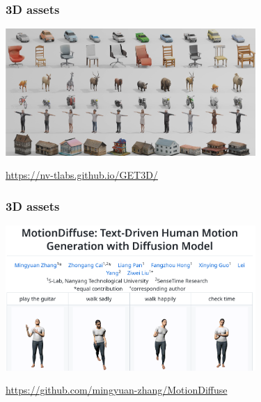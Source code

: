 \documentclass[17pt,aspectratio=169,hyperref={pdfusetitle,colorlinks,allcolors=olive}]{beamer}
\begin{document}
\begin{frame}[fragile]
  \frametitle{3D assets}

  \begin{center}
    \includegraphics[width=9.5cm]{figs/get3d}
  \end{center}

  \begin{flushright}
    {\scriptsize
    \url{https://nv-tlabs.github.io/GET3D/} \\
    }
  \end{flushright}
  
\end{frame}

\begin{frame}[fragile]
  \frametitle{3D assets}

  \begin{center}
    \includegraphics[width=9.5cm]{figs/human-motion}
  \end{center}

  \begin{flushright}
    {\scriptsize
    \url{https://github.com/mingyuan-zhang/MotionDiffuse} \\
    }
  \end{flushright}
  
\end{frame}
\end{document}
